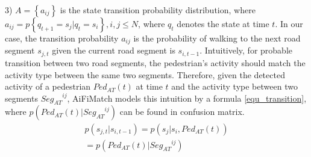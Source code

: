 \documentclass[conference]{IEEEtran}
\begin{document}
3) $A = \left\{ {{a_{ij}}} \right\}$ is the state transition probability distribution, where \\ ${a_{ij}} = p\left\{ {{q_{t + 1}} = {s_j}|{q_t} = {s_i}} \right\}, i, j \le N$, where ${q_t}$ denotes the state at time $t$. In our case, the transition probability $a_{ij}$ is the probability of walking to the next road segment $s_{j,t}$ given the current road segment is $s_{i,t-1}$. Intuitively, for probable transition between two road segments, the pedestrian's activity should match the activity type between the same two segments. Therefore, given the detected activity of a pedestrian ${Ped_{AT}}(t)$ at time $t$ and the activity type between two segments ${Seg_{AT}}^{ij}$, AiFiMatch models this intuition by a formula \ref{equ_transition}, where $p({Ped_{AT}}(t)|{Seg_{AT}}^{ij})$ can be found in confusion matrix.
\begin{equation}
\label{equ_transition}
\begin{array}{l}
p({s_{j,t}}|{s_{i,t - 1}}) = p({s_j}|{s_i},Pe{d_{AT}}(t))\\
= p(Pe{d_{AT}}(t)|Se{g_{AT}}^{ij})
\end{array}
\end{equation}
\end{document}
